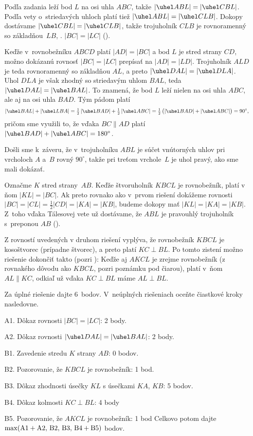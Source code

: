{%
Podľa zadania leží bod $L$ na osi uhla $ABC$, takže
$|\uhel ABL|=|\uhel CBL|$. Podľa vety o~striedavých uhloch
platí tiež $|\uhel ABL|=|\uhel CLB|$. Dokopy dostávame
$|\uhel CBL|=|\uhel CLB|$, takže trojuholník $CLB$ je rovnoramenný so
základňou~$LB$, \tj. $|BC|=|LC|$ (\obr).
%

Keďže v~rovnobežníku $ABCD$ platí $|AD|=|BC|$ a bod $L$ je stred
strany $CD$, možno dokázanú rovnosť $|BC|=|LC|$ prepísať
na $|AD|=|LD|$. Trojuholník $ALD$ je teda rovnoramenný
so základňou $AL$, a preto $|\uhel DAL|=|\uhel DLA|$.
Uhol $DLA$ je však zhodný so striedavým uhlom $BAL$,
teda $|\uhel DAL|=|\uhel BAL|$.
To znamená, že bod $L$ leží nielen na osi uhla $ABC$,
ale aj na osi uhla $BAD$. Tým pádom platí
$$
|\uhel BAL|+|\uhel LBA|=
\tfrac12\,|\uhel BAD|+\tfrac12\,|\uhel ABC|=
\tfrac12\,\bigl(|\uhel BAD|+|\uhel ABC|\bigr)=90^{\circ},
$$
pričom sme využili to, že vďaka $BC\parallel AD$ platí
$|\uhel BAD|+|\uhel ABC|=180^{\circ}$.

Došli sme k~záveru, že v~trojuholníku $ABL$ je súčet vnútorných uhlov
pri vrcholoch $A$ a~$B$ rovný $90^{\circ}$, takže pri treťom vrchole~$L$
je uhol pravý, ako sme mali dokázať.

\ineriesenie
Označme $K$ stred strany~$AB$. Keďže štvoruholník $KBCL$
je rovnobežník, platí v ňom $|KL|=|BC|$. Ak preto rovnako
ako v~prvom riešení dokážeme rovnosti
$|BC|=|CL|=\frac12|CD|=|KA|=|KB|$, budeme dokopy mať
$|KL|=|KA|=|KB|$. Z~toho vďaka Tálesovej vete už
dostávame, že $ABL$ je pravouhlý trojuholník s~preponou $AB$ (\obr).
%

\poznamka
Z rovností uvedených v druhom riešení vyplýva,
že rovnobežník $KBCL$ je kosoštvorec (prípadne štvorec),
a preto platí $KC\perp BL$. Po tomto zistení možno
riešenie dokončiť takto (pozri \obr{}):
Keďže aj $AKCL$ je zrejme rovnobežník (z rovnakého dôvodu ako
$KBCL$, pozri poznámku pod čiarou), platí
v~ňom $AL\parallel KC$, odkiaľ už vďaka $KC\perp BL$ máme $AL\perp BL$.
%

\schemaABC
Za úplné riešenie dajte 6~bodov. V~neúplných riešeniach oceňte
čiastkové kroky nasledovne.
\item{A1.} Dôkaz rovnosti $|BC|=|LC|$: 2 body.
\item{A2.} Dôkaz rovnosti $|\uhel DAL|=|\uhel BAL|$: 2 body.
\item{B1.} Zavedenie stredu $K$ strany $AB$: 0 bodov.
\item{B2.} Pozorovanie, že $KBCL$ je rovnobežník: 1 bod.
\item{B3.} Dôkaz zhodnosti úsečky $KL$ s úsečkami $KA$, $KB$: 5 bodov.
\item{B4.} Dôkaz kolmosti $KC\perp BL$: 4 body
\item{B5.} Pozorovanie, že $AKCL$ je rovnobežník: 1 bod
\endgraf\noindent
Celkovo potom dajte $\rm\max(A1+A2,\,B2,\,B3,\,B4+B5)$ bodov.
\endschema
}

